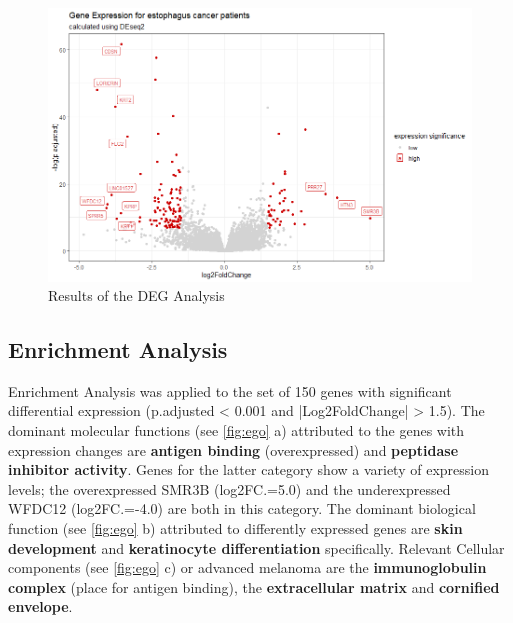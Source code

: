 \documentclass[twoside]{article}
\begin{document}
\begin{figure}[h]
    \centering
    \includegraphics[width=1.2\linewidth]{figures/DEG_result.png}
    \caption{Results of the DEG Analysis}
    \label{fig:DEG-analysis}
\end{figure}

\subsection{Enrichment Analysis}

Enrichment Analysis was applied to the set of 150 genes with significant differential expression (p.adjusted < 0.001 and |Log2FoldChange| > 1.5). The dominant molecular functions (see \ref{fig:ego} a) attributed to the genes with expression changes are \textbf{antigen binding} (overexpressed) and \textbf{peptidase inhibitor activity}. Genes for the latter category show a variety of expression levels; the overexpressed SMR3B (log2FC.=5.0) and the underexpressed  WFDC12 (log2FC.=-4.0) are both in this category. 
The dominant biological function (see \ref{fig:ego} b) attributed to differently expressed genes are \textbf{skin development} and \textbf{keratinocyte differentiation} specifically.  
Relevant Cellular components (see \ref{fig:ego} c) or advanced melanoma are the \textbf{immunoglobulin complex} (place for antigen binding), the \textbf{extracellular matrix} and \textbf{cornified envelope}.
\end{document}
